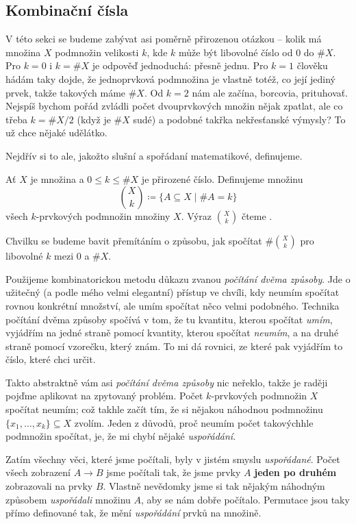 \subsection{Kombinační čísla}
\label{ssec:kombinacni-cisla}

V této sekci se budeme zabývat asi poměrně přirozenou otázkou -- kolik má
množina $X$ podmnožin velikosti $k$, kde $k$ může být libovolné číslo od $0$ do
$\# X$. Pro $k=0$ i $k=\# X$ je odpověď jednoduchá: přesně jednu. Pro $k = 1$
člověku hádám taky dojde, že jednoprvková podmnožina je vlastně totéž, co její
jediný prvek, takže takových máme $\# X$. Od $k = 2$ nám ale začína, borcovia,
prituhovať. Nejspíš bychom pořád zvládli počet dvouprvkových množin nějak
zpatlat, ale co třeba $k = \# X / 2$ (když je $\# X$ sudé) a podobné takřka
nekřesťanské výmysly? To už chce nějaké udělátko.

Nejdřív si to ale, jakožto slušní a spořádaní matematikové, definujeme.

\begin{definition}
 Ať $X$ je množina a $0 \leq k \leq \# X$ je přirozené číslo. Definujeme množinu
 \[
  \binom{X}{k} \coloneqq \{A \subseteq X \mid \# A = k\}
 \]
 všech $k$-prvkových podmnožin množiny $X$. Výraz $\binom{X}{k}$ čteme .
\end{definition}

Chvilku se budeme bavit přemítáním o způsobu, jak spočítat $\# \binom{X}{k}$ pro
libovolné $k$ mezi $0$ a $\# X$.

Použijeme kombinatorickou metodu důkazu zvanou \emph{počítání dvěma způsoby}.
Jde o užitečný (a podle mého velmi elegantní) přístup ve chvíli, kdy neumím
spočítat rovnou konkrétní množství, ale umím spočítat něco vel\-mi podobného.
Technika počítání dvěma způsoby spočívá v tom, že tu kvantitu, kterou spočítat
\emph{umím}, vyjádřím na jedné straně pomocí kvantity, kterou spočítat
\emph{neumím}, a na druhé straně pomocí vzorečku, který znám. To mi dá rovnici,
ze které pak vyjádřím to číslo, které chci určit.

Takto abstraktně vám asi \emph{počítání dvěma způsoby} nic neřeklo, takže je
raději pojďme aplikovat na zpytovaný problém. Počet $k$-prvkových podmnožin $X$
spočítat neumím; což takhle začít tím, že si nějakou náhodnou podmnožinu
$\{x_1,\ldots,x_k\} \subseteq X$ zvolím. Jeden z důvodů, proč neumím počet
takovýchhle podmnožin spočítat, je, že mi chybí nějaké \emph{uspořádání}.

Zatím všechny věci, které jsme počítali, byly v jistém smyslu \emph{uspořádané}.
Počet všech zobrazení $A \to B$ jsme počítali tak, že jsme prvky $A$
\textbf{jeden po druhém} zobrazovali na prvky $B$. Vlastně nevědomky jsme si tak
nějakým náhodným způsobem \emph{uspořádali} množinu $A$, aby se nám dobře
počítalo. Permutace jsou taky přímo definované tak, že mění \emph{uspořádání}
prvků na množině.

